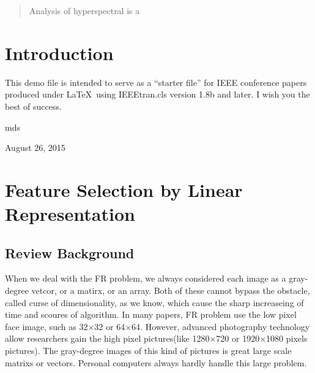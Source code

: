 \documentclass[10pt,journal,final,twocolumn,]{IEEEtran}
\begin{document}
	
	
	
	
	
	
	
	\maketitle
	
	\begin{abstract}
		Analysis of hyperspectral is a 
	\end{abstract}
	
	
	
	
	
	\IEEEpeerreviewmaketitle
	
	
	
	\section{Introduction}
	This demo file is intended to serve as a ``starter file''
	for IEEE conference papers produced under \LaTeX\ using
	IEEEtran.cls version 1.8b and later.
	I wish you the best of success.
	
	\hfill mds
	
	\hfill August 26, 2015
	
	
	\section{Feature Selection by Linear Representation}
	\subsection{Review Background}
	When we deal with the FR problem, we always considered each image as a gray-degree vetcor, or a matirx, or an array. Both of these cannot bypass the obstacle, called curse of dimensionality, as we know, which cause the sharp increaseing of time and scoures of algorithm. In many papers, FR problem use the low pixel face image, such as 32$\times$32 or 64$\times$64. However, advanced photography technology allow researchers gain the high pixel pictures(like 1280$\times$720 or 1920$\times$1080 pixels pictures). The gray-degree images of this kind of pictures is great large scale matrixs or vectors. Personal computers always hardly handle this large problem. 
	
\end{document}
